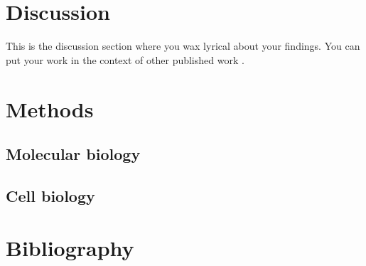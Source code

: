 \section*{Discussion}\label{s:discussion}

This is the discussion section where you wax lyrical about your findings.
You can put your work in the context of other published work \citep{brenner_uga:_1967}.



\section*{Methods}\label{s:methods}

\subsection*{Molecular biology}

\subsection*{Cell biology}



\section*{Bibliography}

